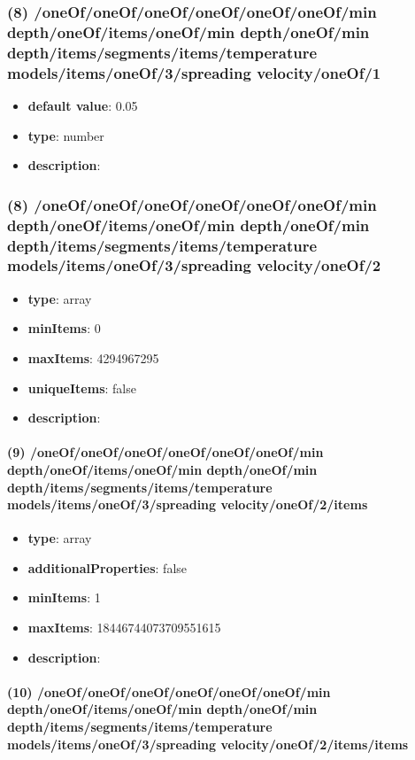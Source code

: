 \subsubsection{(8) /oneOf/oneOf/oneOf/oneOf/oneOf/oneOf/min depth/oneOf/items/oneOf/min depth/oneOf/min depth/items/segments/items/temperature models/items/oneOf/3/spreading velocity/oneOf/1}
\begin{itemize}[leftmargin=8em]\item {\bf default value}: 0.05
\item {\bf type}: number
\item {\bf description}: 
\end{itemize}\subsubsection{(8) /oneOf/oneOf/oneOf/oneOf/oneOf/oneOf/min depth/oneOf/items/oneOf/min depth/oneOf/min depth/items/segments/items/temperature models/items/oneOf/3/spreading velocity/oneOf/2}
\begin{itemize}[leftmargin=8em]\item {\bf type}: array
\item {\bf minItems}: 0
\item {\bf maxItems}: 4294967295
\item {\bf uniqueItems}: false
\item {\bf description}: 
\end{itemize}\paragraph{(9) /oneOf/oneOf/oneOf/oneOf/oneOf/oneOf/min depth/oneOf/items/oneOf/min depth/oneOf/min depth/items/segments/items/temperature models/items/oneOf/3/spreading velocity/oneOf/2/items}
\begin{itemize}[leftmargin=9em]\item {\bf type}: array
\item {\bf additionalProperties}: false
\item {\bf minItems}: 1
\item {\bf maxItems}: 18446744073709551615
\item {\bf description}: 
\end{itemize}\paragraph{(10) /oneOf/oneOf/oneOf/oneOf/oneOf/oneOf/min depth/oneOf/items/oneOf/min depth/oneOf/min depth/items/segments/items/temperature models/items/oneOf/3/spreading velocity/oneOf/2/items/items}
